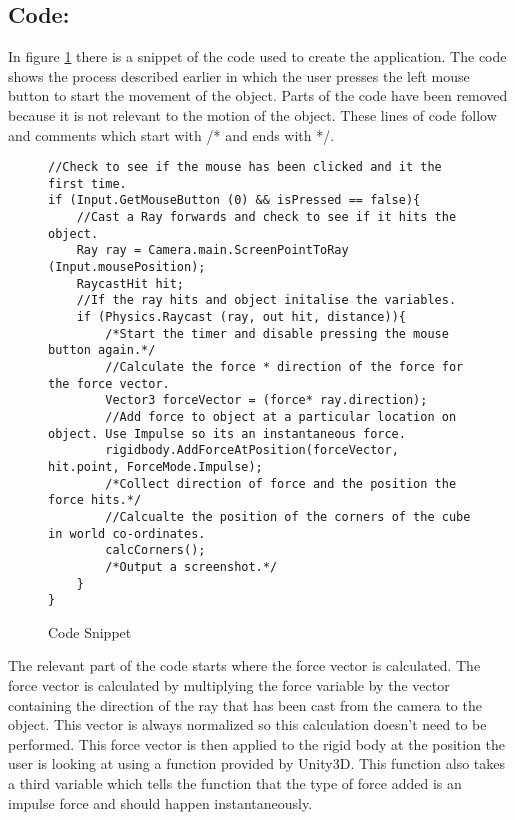\subsection{Code:}\label{sc:Code}
In figure \ref*{sc:SourceCode} there is a snippet of the code used to create the application.
The code shows the process described earlier in which the user presses the left mouse button to start the movement of the object.
Parts of the code have been removed because it is not relevant to the motion of the object.
These lines of code follow and comments which start with /* and ends with */.
\begin{figure}[h]
\centering
\begin{lstlisting}
//Check to see if the mouse has been clicked and it the first time.
if (Input.GetMouseButton (0) && isPressed == false){
	//Cast a Ray forwards and check to see if it hits the object.
	Ray ray = Camera.main.ScreenPointToRay (Input.mousePosition);
	RaycastHit hit;
	//If the ray hits and object initalise the variables.
	if (Physics.Raycast (ray, out hit, distance)){
		/*Start the timer and disable pressing the mouse button again.*/
		//Calculate the force * direction of the force for the force vector.
		Vector3 forceVector = (force* ray.direction);
		//Add force to object at a particular location on object. Use Impulse so its an instantaneous force.
		rigidbody.AddForceAtPosition(forceVector, hit.point, ForceMode.Impulse);
		/*Collect direction of force and the position the force hits.*/
		//Calcualte the position of the corners of the cube in world co-ordinates.
		calcCorners();
		/*Output a screenshot.*/
	}
}
\end{lstlisting}
\caption{Code Snippet}
\label{sc:SourceCode}
\end{figure}

The relevant part of the code starts where the force vector is calculated.
The force vector is calculated by multiplying the force variable by the vector containing the direction of the ray that has been cast from the camera to the object.
This vector is always normalized so this calculation doesn't need to be performed.
This force vector is then applied to the rigid body at the position the user is looking at using a function provided by Unity3D.
This function also takes a third variable which tells the function that the type of force added is an impulse force and should happen instantaneously.